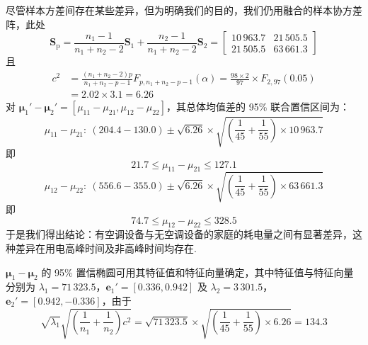 尽管样本方差间存在某些差异，但为明确我们的目的，我们仍用融合的样本协方差阵，此处
\[
\mathbf{S}_\mathrm{p}=\frac{n_1-1}{n_1+n_2-2}\mathbf{S}_1+\frac{n_2-1}{n_1+n_2-2}\mathbf{S}_2=\begin{bmatrix}10\,963.7&21\,505.5\\21\,505.5&63\,661.3\end{bmatrix}
\]
且
\[
\begin{aligned}
c^2&=\frac{(n_1+n_2-2)p}{n_1+n_2-p-1}F_{p,n_1+n_2-p-1}(\alpha)=\frac{98\times 2}{97}\times F_{2,97}(0.05)\\
&=2.02\times 3.1=6.26
\end{aligned}
\]
对 $\boldsymbol{\mu}_1'-\boldsymbol{\mu}_2'=[\mu_{11}-\mu_{21},\mu_{12}-\mu_{22}]$，其总体均值差的 95\% 联合置信区间为：
\[
\mu_{11}-\mu_{21}:\ (204.4-130.0)\pm\sqrt{6.26}\times\sqrt{\left(\frac{1}{45}+\frac{1}{55}\right)\times 10\,963.7}
\]
即
\[
21.7\leqslant\mu_{11}-\mu_{21}\leqslant 127.1
\]
\[
\mu_{12}-\mu_{22}:\ (556.6-355.0)\pm\sqrt{6.26}\times\sqrt{\left(\frac{1}{45}+\frac{1}{55}\right)\times 63\,661.3}
\]
即
\[
74.7\leqslant\mu_{12}-\mu_{22}\leqslant 328.5
\]
于是我们得出结论：有空调设备与无空调设备的家庭的耗电量之间有显著差异，这种差异在用电高峰时间及非高峰时间均存在.

$\boldsymbol{\mu}_1-\boldsymbol{\mu}_2$ 的 95\% 置信椭圆可用其特征值和特征向量确定，其中特征值与特征向量分别为 $\lambda_1=71\,323.5$，$\mathbf{e}_1'=[0.336,0.942]$ 及 $\lambda_2=3\,301.5$，$\mathbf{e}_2'=[0.942,-0.336]$，由于
\[
\sqrt{\lambda_1}\sqrt{\left(\frac{1}{n_1}+\frac{1}{n_2}\right)c^2}=\sqrt{71\,323.5}\times\sqrt{\left(\frac{1}{45}+\frac{1}{55}\right)\times 6.26}=134.3
\]
